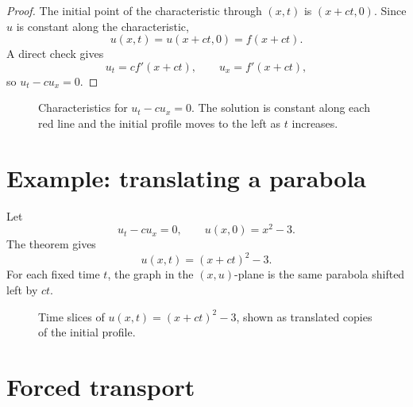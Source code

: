 \begin{proof}
The initial point of the characteristic through \((x,t)\) is \((x+ct,0)\).  Since \(u\) is constant along the characteristic,
\[
  u(x,t)=u(x+ct,0)=f(x+ct).
\]
A direct check gives
\[
  u_t=c f'(x+ct),\qquad u_x=f'(x+ct),
\]
so \(u_t-c u_x=0\).
\end{proof}

\begin{figure}[H]
\centering
{}
\caption{Characteristics for \(u_t-c u_x=0\).  The solution is constant along each red line and the initial profile moves to the left as \(t\) increases.}
\end{figure}

\section{Example: translating a parabola}

Let
\[
  u_t-c u_x=0,\qquad u(x,0)=x^2-3.
\]
The theorem gives
\[
  u(x,t)=(x+ct)^2-3.
\]
For each fixed time \(t\), the graph in the \((x,u)\)-plane is the same parabola shifted left by \(ct\).

\begin{figure}[H]
\centering
{}
\caption{Time slices of \(u(x,t)=(x+ct)^2-3\), shown as translated copies of the initial profile.}
\end{figure}

\section{Forced transport}

